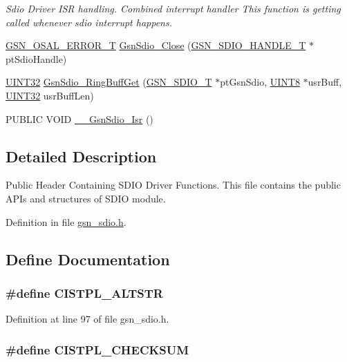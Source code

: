 \begin{DoxyCompactItemize}
\begin{DoxyCompactList}\small\item\em Sdio Driver ISR handling. Combined interrupt handler This function is getting called whenever sdio interrupt happens. \end{DoxyCompactList}\item 
\hyperlink{a00659_ga36216a7aacd1d5024bc7b8bf39c3f46b}{GSN\_\-OSAL\_\-ERROR\_\-T} \hyperlink{a00584_a859eacaf0d357416ac837914d0feea2d}{GsnSdio\_\-Close} (\hyperlink{a00224}{GSN\_\-SDIO\_\-HANDLE\_\-T} $\ast$ptSdioHandle)
\item 
\hyperlink{a00660_gae1e6edbbc26d6fbc71a90190d0266018}{UINT32} \hyperlink{a00584_a773f052f49b9c8ea476fa92003733fb2}{GsnSdio\_\-RingBuffGet} (\hyperlink{a00216}{GSN\_\-SDIO\_\-T} $\ast$ptGsnSdio, \hyperlink{a00660_gab27e9918b538ce9d8ca692479b375b6a}{UINT8} $\ast$usrBuff, \hyperlink{a00660_gae1e6edbbc26d6fbc71a90190d0266018}{UINT32} usrBuffLen)
\item 
PUBLIC VOID \hyperlink{a00584_aa5504afe017aad91877a9e13446e9948}{\_\-\_\-GsnSdio\_\-Isr} ()
\end{DoxyCompactItemize}


\subsection{Detailed Description}
Public Header Containing SDIO Driver Functions. This file contains the public APIs and structures of SDIO module. 

Definition in file \hyperlink{a00584_source}{gsn\_\-sdio.h}.



\subsection{Define Documentation}
\hypertarget{a00584_a371a087a67afaf0ce4f91fd2c46f50af}{
\subsubsection[{CISTPL\_\-ALTSTR}]{\setlength{\rightskip}{0pt plus 5cm}\#define CISTPL\_\-ALTSTR}}
\label{a00584_a371a087a67afaf0ce4f91fd2c46f50af}


Definition at line 97 of file gsn\_\-sdio.h.

\hypertarget{a00584_a8f83e4bdfc4ae662c4a952a307dbfc9d}{
\subsubsection[{CISTPL\_\-CHECKSUM}]{\setlength{\rightskip}{0pt plus 5cm}\#define CISTPL\_\-CHECKSUM}}
\label{a00584_a8f83e4bdfc4ae662c4a952a307dbfc9d}


